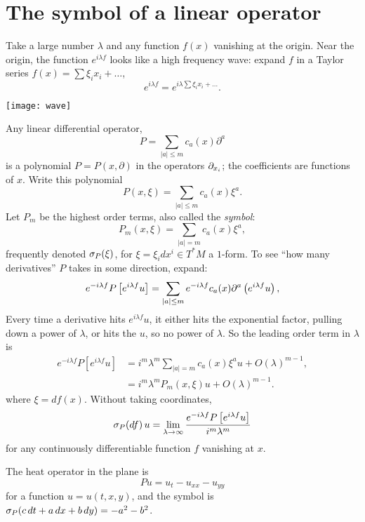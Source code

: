 \section{The symbol of a linear operator}
Take a large number \(\lambda\) and any function \(f(x)\) vanishing at the origin.
Near the origin, the function \(e^{i\lambda f}\) looks like a high frequency wave: expand \(f\) in a Taylor series \(f(x)=\sum \xi_i x_i + \dots\),
\[
e^{i\lambda f} = e^{i \lambda \sum \xi_i x_i + \dots}.
\]
\begin{center}
\texttt{[image: wave]}
\end{center}
Any linear differential operator,
\[
P=\sum_{|a|\le m} c_a(x) \partial^a
\]
is a polynomial \(P=P(x,\partial)\) in the operators \(\partial_{x_i}\); the coefficients are functions of \(x\).
Write this polynomial
\[
P(x,\xi)=
\sum_{|a|\le m} c_a(x) \xi^a.
\]
Let \(P_m\) be the highest order terms, also called the \emph{symbol}:
\[
P_m(x,\xi)=\sum_{|a|=m} c_a(x) \xi^a,
\]
frequently denoted \(\opsymbol[P]{\xi}\), for \(\xi=\xi_i dx^i \in T^* M\) a \(1\)-form.
To see ``how many derivatives'' \(P\) takes in some direction, expand:
\[
e^{-i\lambda f}P\left[e^{i \lambda f}u\right]
=
\sum_{|a|\le m} e^{-i\lambda f}c_a(x) \partial^a \left(e^{i\lambda f}u\right),
\]
Every time a derivative hits \(e^{i\lambda f}u\), it either hits the exponential factor, pulling down a power of \(\lambda\), or hits the \(u\), so no power of \(\lambda\).
So the leading order term in \(\lambda\) is
\begin{align*}
e^{-i\lambda f}P\left[e^{i \lambda f}u\right]
&=i^m \lambda^m \sum_{|a|=m} c_a(x) \xi^a u + O(\lambda)^{m-1},
\\
&=i^m\lambda^mP_m(x,\xi)u+O(\lambda)^{m-1}.
\end{align*}
where \(\xi=df(x)\).
Without taking coordinates,
\[
\opsymbol[P]{df}u=\lim_{\lambda \to \infty} \frac{e^{-i\lambda f} P \left[e^{i\lambda f}u\right]}{i^m\lambda^m}
\]
for any continuously differentiable function \(f\) vanishing at \(x\).
\begin{example}
The heat operator in the plane is
\[
Pu=u_t-u_{xx}-u_{yy}
\]
for a function \(u=u(t,x,y)\), and the symbol is \(\opsymbol[P]{c \, dt + a \, dx + b \, dy}=-a^2-b^2\).
\end{example}

